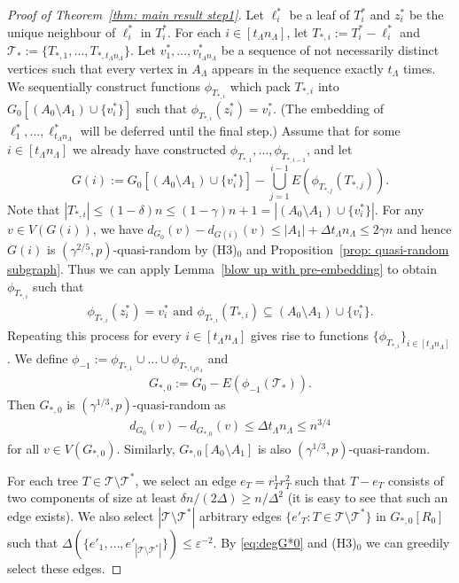\documentclass[a4paper, 11pt, reqno]{amsart}
\numberwithin{equation}{section}
\newcommand{\1}{{\rm 1\hspace*{-0.4ex}%
\rule{0.1ex}{1.52ex}\hspace*{0.2ex}}}
\newcommand{\cT}{\mathcal{T}}
\renewcommand{\epsilon}{\varepsilon}
\newcommand{\sm}{\setminus}
\newcommand{\COMMENT}[1]{}
\newcounter{step}
\begin{document}
\begin{proof}[Proof of Theorem~\ref{thm: main result step1}]
Let $\ell^*_i$ be a leaf of $T^*_i$ and $z^*_i$ be the unique neighbour of $\ell^*_i$ in $T^*_i$. 
For each $i\in [t_{\Lambda}n_{\Lambda}]$, let $T_{*,i}:= T^*_i - \ell^*_i$ and $\cT_*:=\{ T_{*,1},\dots, T_{*,t_{\Lambda}n_{\Lambda}}\} $.
Let $v^*_1,\dots, v^*_{t_{\Lambda}n_{\Lambda}}$ be a sequence of not necessarily distinct vertices such that 
every vertex in $A_{\Lambda}$ appears in the sequence exactly $t_{\Lambda}$ times. 
We sequentially construct functions $\phi_{T_{*,i}}$ which pack $T_{*,i}$ into $G_0[(A_0\setminus A_1)\cup \{v^*_i\}]$ such that $\phi_{T_{*,i}}(z^*_i)= v^*_i$.  
(The embedding of $\ell_1^*,\ldots,\ell_{t_\Lambda n_\Lambda}^*$ will be deferred until the final step.)
Assume that for some $i\in [t_\Lambda n_\Lambda]$ we already have constructed $\phi_{T_{*,1}},\dots, \phi_{T_{*,i-1}}$, and let 
$$G(i):= G_0[ (A_0\setminus A_1) \cup \{v^*_i\}] - \bigcup_{j=1}^{i-1}E(\phi_{T_{*,j}}(T_{*,j})).$$
Note that $|T_{*,i}|\leq (1- \delta)n\leq (1-\gamma)n+1 = |(A_0\setminus A_1) \cup\{v^*_i\}|$.
For any $v\in V(G(i))$, 
we have $d_{G_0}(v) - d_{G(i)}(v) \leq |A_{1}| + \Delta t_{\Lambda}n_{\Lambda} \leq 2\gamma n$ 
and hence $G(i)$ is $(\gamma^{2/5},p)$-quasi-random by (H3)$_0$ and Proposition~\ref{prop: quasi-random subgraph}. 
Thus we can apply Lemma~\ref{blow up with pre-embedding} to obtain $\phi_{T_{*,i}}$ such that 
\begin{align}\label{eq:treeslast}
\phi_{T_{*,i}}(z^*_{i}) = v^*_i \text{ and }\phi_{T_{*,i}}(T_{*,i}) \subseteq (A_0\setminus A_1)\cup \{v^*_i\}. 
\end{align}
Repeating this process for every $i\in [t_{\Lambda}n_{\Lambda}]$
gives rise to functions $\{\phi_{T_{*,i}}\}_{i\in [t_{\Lambda}n_{\Lambda}]}$. 
We define $\phi_{-1}:=\phi_{T_{*,1}}\cup \ldots \cup \phi_{T_{*,t_{\Lambda}n_{\Lambda}}}$ and
\begin{align}\label{eq:treeslast2}
	G_{*,0}:=G_0 - E(\phi_{-1}(\cT_*)).
\end{align}
Then $G_{*,0}$ is $(\gamma^{1/3},p)$-quasi-random as
\begin{align}\label{eq:degG*0}
	 d_{G_0}(v)- d_{G_{*,0}}(v) \leq \Delta t_{\Lambda}n_{\Lambda} \leq n^{3/4}
\end{align}
for all $v\in V(G_{*,0})$. 
Similarly, $G_{*,0}[A_0\setminus A_1]$ is also $(\gamma^{1/3},p)$-quasi-random. 

For each tree $T\in \cT\sm\cT^*$, 
we select an edge $e_T = r^{1}_{T} r^{2}_{T}$ such that 
$T-e_T$ consists of two components of size at least $\delta n/(2\Delta)\geq n/\Delta^2$ (it is easy to see that such an edge exists).
We also select $|\cT\sm\cT^*|$ arbitrary edges $\{e'_T : T\in \cT\sm \cT^*\}$ in $G_{*,0}[R_0]$ %
such that $\Delta( \{e'_1,\dots, e'_{|\cT\sm\cT^*|}\})\leq \epsilon^{-2}$. 
By \eqref{eq:degG*0} and (H3)$_{0}$ we can greedily select these edges.%
\COMMENT{Use the edges incident to a vertex $u$ as long as $u$ is incident to at most $\epsilon^{-2}$ selected edges.
Call the others 'bad'.
Note that $|\cT\sm \cT^*| \leq |\cT| \leq n/\delta$.
So $|bad|\leq (n/\delta)/\epsilon^{-2}\leq \epsilon^{3/2}n=\epsilon^{1/2}|R_0|$. 

}
\end{proof}
\end{document}
